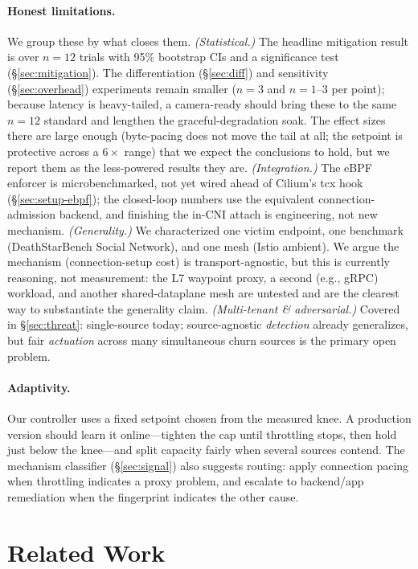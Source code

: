 \documentclass[10pt,twocolumn]{article}
\begin{document}
\paragraph{Honest limitations.} We group these by what closes them.
\emph{(Statistical.)} The headline mitigation result is over $n{=}12$ trials with 95\%
bootstrap CIs and a significance test (\S\ref{sec:mitigation}). The differentiation
(\S\ref{sec:diff}) and sensitivity (\S\ref{sec:overhead}) experiments remain smaller
($n{=}3$ and $n{=}1$--$3$ per point); because latency is heavy-tailed, a camera-ready
should bring these to the same $n{=}12$ standard and lengthen the graceful-degradation
soak. The effect sizes there are large enough (byte-pacing does not move the tail at all;
the setpoint is protective across a $6\times$ range) that we expect the conclusions to
hold, but we report them as the less-powered results they are.
\emph{(Integration.)} The eBPF enforcer is microbenchmarked, not yet wired ahead of
Cilium's tcx hook (\S\ref{sec:setup-ebpf}); the closed-loop numbers use the equivalent
connection-admission backend, and finishing the in-CNI attach is engineering, not new
mechanism.
\emph{(Generality.)} We characterized one victim endpoint, one benchmark
(DeathStarBench Social Network), and one mesh (Istio ambient). We argue the mechanism
(connection-setup cost) is transport-agnostic, but this is currently reasoning, not
measurement: the L7 waypoint proxy, a second (e.g., gRPC) workload, and another
shared-dataplane mesh are untested and are the clearest way to substantiate the generality
claim. \emph{(Multi-tenant \& adversarial.)} Covered in \S\ref{sec:threat}: single-source
today; source-agnostic \emph{detection} already generalizes, but fair \emph{actuation}
across many simultaneous churn sources is the primary open problem.

\paragraph{Adaptivity.} Our controller uses a fixed setpoint chosen from the measured
knee. A production version should learn it online---tighten the cap until throttling
stops, then hold just below the knee---and split capacity fairly when several sources
contend. The mechanism classifier (\S\ref{sec:signal}) also suggests routing: apply
connection pacing when throttling indicates a proxy problem, and escalate to
backend/app remediation when the fingerprint indicates the other cause.

\section{Related Work}
\end{document}

